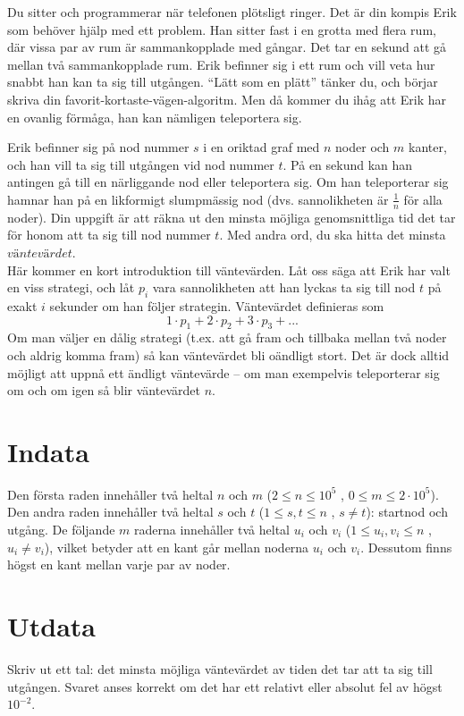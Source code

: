 Du sitter och programmerar när telefonen plötsligt ringer. Det är din kompis Erik som behöver hjälp med ett problem.
Han sitter fast i en grotta med flera rum, där vissa par av rum är sammankopplade med gångar.
Det tar en sekund att gå mellan två sammankopplade rum. Erik befinner sig i ett rum och vill veta
hur snabbt han kan ta sig till utgången. ``Lätt som en plätt'' tänker du, och börjar skriva 
din favorit-kortaste-vägen-algoritm. Men då kommer du ihåg att Erik har en ovanlig förmåga, han kan nämligen teleportera sig.

Erik befinner sig på nod nummer $s$ i en oriktad graf med $n$ noder och $m$ kanter, och han vill ta sig till utgången vid nod nummer $t$. På en sekund kan han antingen gå till
en närliggande nod eller teleportera sig. Om han teleporterar sig hamnar han på en likformigt slumpmässig nod (dvs. sannolikheten är $\frac{1}{n}$ för alla noder).
Din uppgift är att räkna ut den minsta möjliga genomsnittliga tid det tar för honom att ta sig till nod nummer $t$. Med andra ord, du ska hitta det minsta $\textit{väntevärdet}$.\\

Här kommer en kort introduktion till väntevärden. Låt oss säga att Erik har valt en viss strategi, och låt $p_i$ vara sannolikheten att han lyckas
ta sig till nod $t$ på exakt $i$ sekunder om han följer strategin. Väntevärdet definieras som
$$1\cdot p_1 + 2\cdot p_2 + 3\cdot p_3 + ...$$
Om man väljer en dålig strategi (t.ex. att gå fram och tillbaka mellan två noder och aldrig komma fram) så kan väntevärdet bli oändligt stort.
Det är dock alltid möjligt att uppnå ett ändligt väntevärde -- om man exempelvis teleporterar sig om och om igen så blir väntevärdet $n$.

\section*{Indata}
Den första raden innehåller två heltal $n$ och $m$ ($2 \leq n \leq 10^5$ , $0 \leq m \leq 2\cdot 10^5$).
Den andra raden innehåller två heltal $s$ och $t$ ($1 \leq s,t \leq n$ , $s \neq t$): startnod och utgång.
De följande $m$ raderna innehåller två heltal $u_i$ och $v_i$ ($1 \leq u_i , v_i \leq n$ , $u_i \neq v_i$), 
vilket betyder att en kant går mellan noderna $u_i$ och $v_i$. Dessutom finns högst en kant mellan varje par av noder.

\section*{Utdata}
Skriv ut ett tal: det minsta möjliga väntevärdet av tiden det tar att ta sig till utgången.
Svaret anses korrekt om det har ett relativt eller absolut fel av högst $10^{-2}$.

